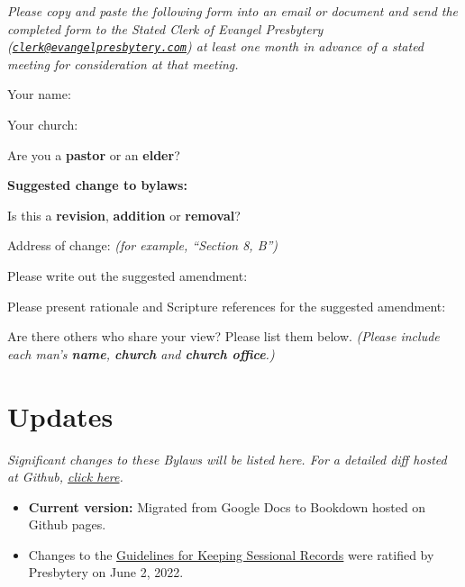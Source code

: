 \documentclass[
]{book}
\providecommand{\tightlist}{%
  \setlength{\itemsep}{0pt}\setlength{\parskip}{0pt}}
\begin{document}
\emph{Please copy and paste the following form into an email or document and send the completed form to the Stated Clerk of Evangel Presbytery (\href{mailto:clerk@evangelpresbytery.com}{\nolinkurl{clerk@evangelpresbytery.com}}) at least one month in advance of a stated meeting for consideration at that meeting.}

Your name:

Your church:

Are you a \textbf{pastor} or an \textbf{elder}?

\textbf{Suggested change to bylaws:}

Is this a \textbf{revision}, \textbf{addition} or \textbf{removal}?

Address of change: \emph{(for example, ``Section 8, B'')}

Please write out the suggested amendment:

Please present rationale and Scripture references for the suggested amendment:

Are there others who share your view? Please list them below. \emph{(Please include each man's \textbf{name}, \textbf{church} and \textbf{church office}.)}

\hypertarget{updates}{%
\chapter*{Updates}\label{updates}}

\emph{Significant changes to these Bylaws will be listed here. For a detailed diff hosted at Github, \href{https://github.com/Evangel-Presbytery/evangel-bylaws}{click here}.}

\begin{itemize}
\tightlist
\item
  \textbf{Current version:} Migrated from Google Docs to Bookdown hosted on Github pages.
\item
  Changes to the \href{https://bylaws.evangelpresbytery.com/bylaws.html\#appendix-1-guidelines-for-keeping-sessional-records}{Guidelines for Keeping Sessional Records} were ratified by Presbytery on June 2, 2022.
\end{itemize}
\end{document}
